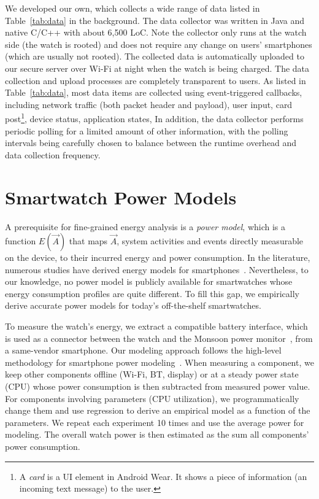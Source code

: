 We developed our own, which collects a wide range of data listed in Table~\ref{tab:data} in the background. The data collector was written in Java and native C/C++ with about 6,500 LoC.
%
Note the collector only runs at the watch side (the watch is rooted) and does not require any change on users' smartphones (which are usually not rooted).
The collected data is automatically uploaded to our secure server over Wi-Fi at night when the watch is being charged.
The data collection and upload processes are completely transparent to users.
%
As listed in Table~\ref{tab:data},
most data items are collected using event-triggered callbacks, including network traffic (both packet header and payload), user input, card post\footnote{A \emph{card} is a UI element in Android Wear. It shows a piece of information (\eg an incoming text message) to the user.}, device status, application states, \etc
%
In addition, the data collector performs periodic polling for a limited amount of other information, with the polling intervals being carefully chosen to balance between the runtime overhead and data collection frequency.


\section{Smartwatch Power Models}
A prerequisite for fine-grained energy analysis is a \emph{power model}, which is a function $E(\vec{A})$ that maps $\vec{A}$, system activities and events directly measurable on the device, to their incurred energy and power consumption. In the literature, numerous studies have derived energy models for smartphones~\cite{zhang10, qian11_mobisys, huang12_mobisys, pathak11_eurosys, pathak12_eurosys, nika:www, chen15:mobicom}. Nevertheless, to our knowledge, no power model is publicly available for smartwatches whose energy consumption profiles are quite different. To fill this gap, we empirically derive accurate power models for today's off-the-shelf smartwatches.

To measure the watch's energy,
%
we extract a compatible battery interface, which is used as a connector between the watch and the Monsoon power monitor~\cite{monsoon}, from a same-vendor smartphone.
%
Our modeling approach follows the high-level methodology for smartphone power modeling~\cite{zhang10, chen15:mobicom, nika:www}.
When measuring a component, we keep other components offline (\eg Wi-Fi, BT, display) or at a steady power state (\eg CPU) whose power consumption is then subtracted from measured power value.
%
For components involving parameters (\eg CPU utilization), we programmatically change them and use regression to derive an empirical model as a function of the parameters.
We repeat each experiment 10 times and use the average power for modeling.
The overall watch power is then estimated as the sum all components' power consumption.

